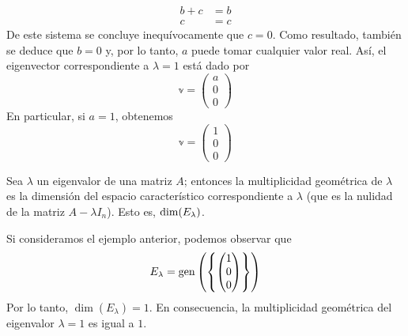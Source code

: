 \begin{example}
\begin{align*}
        b + c & = b \\
        c & = c
    \end{align*}
    De este sistema se concluye inequívocamente que $c = 0$. Como resultado, también se deduce que $b = 0$ y, por lo tanto, $a$ puede tomar cualquier valor real. Así, el eigenvector correspondiente a $\lambda = 1$ está dado por
    $$\mathbb{v} = \begin{pmatrix}
        a \\
        0 \\
        0
    \end{pmatrix}$$
    En particular, si $a = 1$, obtenemos
    $$\mathbb{v} = \begin{pmatrix}
        1 \\
        0 \\
        0
    \end{pmatrix}$$
\end{example}

\begin{definition}
    Sea $\lambda$ un eigenvalor de una matriz $A$; entonces la multiplicidad geométrica de $\lambda$ es la dimensión del espacio característico correspondiente a $\lambda$ (que es la nulidad de la matriz $A - \lambda I_n$). Esto es, $\operatorname{dim} (E_{\lambda})$.
\end{definition}

\begin{example}
    Si consideramos el ejemplo anterior, podemos observar que
    $$E_{\lambda} = \operatorname{gen} \left(\left\{ \begin{pmatrix}
        1 \\
        0 \\
        0
    \end{pmatrix} \right\}\right)$$
    Por lo tanto, $\dim(E_{\lambda}) = 1$. En consecuencia, la multiplicidad geométrica del eigenvalor $\lambda = 1$ es igual a $1$.
\end{example}

